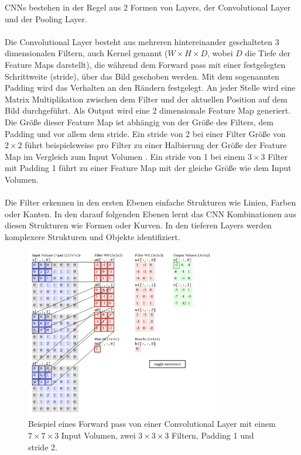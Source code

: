 \gls{CNN}s bestehen in der Regel aus 2 Formen von \gls{Layer}s, der Convolutional \gls{Layer} und der Pooling Layer.
\\
\\
Die Convolutional \gls{Layer} besteht aus mehreren hintereinander geschalteten 3 dimensionalen
Filtern, auch Kernel genannt ($ W \times H \times D$, wobei $D$ die Tiefe der Feature Maps darstellt), die während dem Forward pass mit
einer festgelegten Schrittweite (\gls{stride}), über das Bild geschoben werden. Mit dem sogenannten Padding wird das Verhalten an den Rändern festgelegt.
An jeder Stelle wird eine Matrix Multiplikation zwischen dem Filter und der aktuellen Position auf dem Bild durchgeführt.
Als Output wird eine 2 dimensionale Feature Map generiert. Die Größe dieser Feature Map ist abhängig
von der Größe des Filters, dem Padding und vor allem dem \gls{stride}. Ein \gls{stride} von 2 bei einer Filter Größe von $ 2\times2 $ führt beispielsweise
pro Filter zu einer Halbierung der Größe der Feature Map im Vergleich zum Input Volumen \cite{aufbau-funktion-convnet}.
Ein \gls{stride} von 1 bei einem $ 3\times3 $ Filter mit Padding 1 führt zu einer Feature Map mit der gleiche Größe wie dem Input Volumen.
\\
\\
Die Filter erkennen in den ersten Ebenen einfache Strukturen wie Linien, Farben oder Kanten. In den darauf folgenden Ebenen lernt das CNN Kombinationen aus
diesen Strukturen wie Formen oder Kurven. In den tieferen \gls{Layer}s werden komplexere Strukturen und Objekte identifiziert.

\begin{figure}[H]
  \centering
  \includegraphics[width=0.75\textwidth]{resources/cnn/funktion-cnn.png}
  \caption{
    Beispiel eines Forward pass von einer Convolutional \gls{Layer} mit einem $ 7\times7\times3 $ Input Volumen, zwei $3\times3\times3$ Filtern,
    Padding 1 und \gls{stride} 2.
    \cite{convnet-demo}
  }
  \label{image:convnet-demo}
\end{figure}

